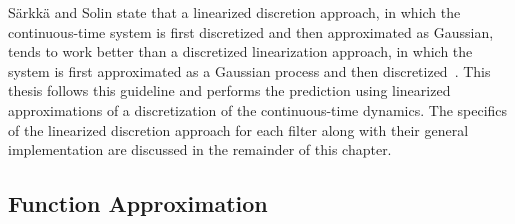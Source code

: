 \documentclass[../zhang_thesis.tex]{subfiles}
\begin{document}
S\"arkk\"a and Solin state that a linearized discretion approach, in which the continuous-time system is first discretized and then approximated as Gaussian, tends to work better than a discretized linearization approach, in which the system is first approximated as a Gaussian process and then discretized~\cite{sarkka12}. This thesis follows this guideline and performs the prediction using linearized approximations of a discretization of the continuous-time dynamics. The specifics of the
linearized discretion approach for each filter along with their general implementation are discussed in the remainder of this chapter.

\subsection{Function Approximation}

\end{document}
